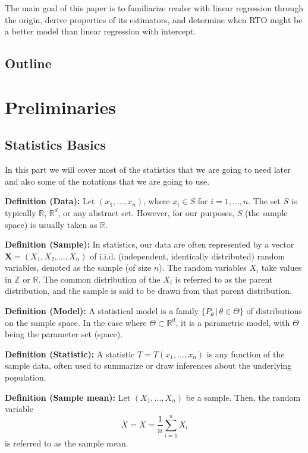 \documentclass[12pt,a4paper,oneside]{book} %
\begin{document}
	The main goal of this paper is to familiarize reader with linear regression through the origin, derive properties of its estimators, and determine when RTO might be a better model than linear regression with intercept.
	
	\section{Outline}

		
	\chapter{Preliminaries}


	\section{Statistics Basics}
	
	In this part we will cover most of the statistics that we are going to need later and also some of the notations that we are going to use.
	
	

\textbf{Definition (Data):} Let $(x_1, \ldots, x_n)$, where $x_i \in S$ for $i = 1, \ldots, n$. The set $S$ is typically $\mathbb{R}$, $\mathbb{R}^d$, or any abstract set. However, for our purposes, $S$ (the sample space) is usually taken as $\mathbb{R}$.

\textbf{Definition (Sample):} In statistics, our data are often represented by a vector $\mathbf{X} = (X_1, X_2, \ldots, X_n)$ of i.i.d. (independent, identically distributed) random variables, denoted as the sample (of size $n$). The random variables $X_i$ take values in $\mathbb{Z}$ or $\mathbb{R}$. The common distribution of the $X_i$ is referred to as the parent distribution, and the sample is said to be drawn from that parent distribution.

\textbf{Definition (Model):} A statistical model is a family $\{P_{\theta} \,|\, \theta \in \Theta\}$ of distributions on the sample space. In the case where $\Theta \subset \mathbb{R}^d$, it is a parametric model, with $\Theta$ being the parameter set (space).

\textbf{Definition (Statistic):} A statistic $T=T(x_1,...,x_n )$ is any function of the sample data, often used to summarize or draw inferences about the underlying population.

\textbf{Definition (Sample mean):} Let $(X_1, \ldots, X_n)$ be a sample. Then, the random variable
\[ \bar{X} = X = \frac{1}{n} \sum_{i=1}^{n} X_i \]
is referred to as the sample mean.
\end{document}
